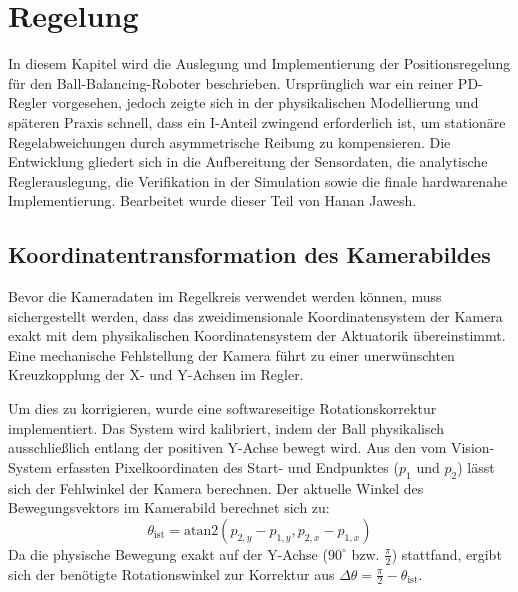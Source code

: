 \documentclass[11pt, a4paper]{scrreprt}
\begin{document}
\chapter{Regelung}

In diesem Kapitel wird die Auslegung und Implementierung der Positionsregelung für den Ball-Balancing-Roboter beschrieben. Ursprünglich war ein reiner PD-Regler vorgesehen, jedoch zeigte sich in der physikalischen Modellierung und späteren Praxis schnell, dass ein I-Anteil zwingend erforderlich ist, um stationäre Regelabweichungen durch asymmetrische Reibung zu kompensieren. Die Entwicklung gliedert sich in die Aufbereitung der Sensordaten, die analytische Reglerauslegung, die Verifikation in der Simulation sowie die finale hardwarenahe Implementierung. Bearbeitet wurde dieser Teil von Hanan Jawesh.

\section{Koordinatentransformation des Kamerabildes}
\label{sec:koordinatentransformation}

Bevor die Kameradaten im Regelkreis verwendet werden können, muss sichergestellt werden, dass das zweidimensionale Koordinatensystem der Kamera exakt mit dem physikalischen Koordinatensystem der Aktuatorik übereinstimmt. Eine mechanische Fehlstellung der Kamera führt zu einer unerwünschten Kreuzkopplung der X- und Y-Achsen im Regler.

Um dies zu korrigieren, wurde eine softwareseitige Rotationskorrektur implementiert. Das System wird kalibriert, indem der Ball physikalisch ausschließlich entlang der positiven Y-Achse bewegt wird. Aus den vom Vision-System erfassten Pixelkoordinaten des Start- und Endpunktes ($p_1$ und $p_2$) lässt sich der Fehlwinkel der Kamera berechnen. Der aktuelle Winkel des Bewegungsvektors im Kamerabild berechnet sich zu:
\begin{equation}
    \theta_{\text{ist}} = \text{atan2}(p_{2,y} - p_{1,y}, p_{2,x} - p_{1,x})
\end{equation}
Da die physische Bewegung exakt auf der Y-Achse ($90^\circ$ bzw. $\frac{\pi}{2}$) stattfand, ergibt sich der benötigte Rotationswinkel zur Korrektur aus $\Delta\theta = \frac{\pi}{2} - \theta_{\text{ist}}$.
\end{document}
